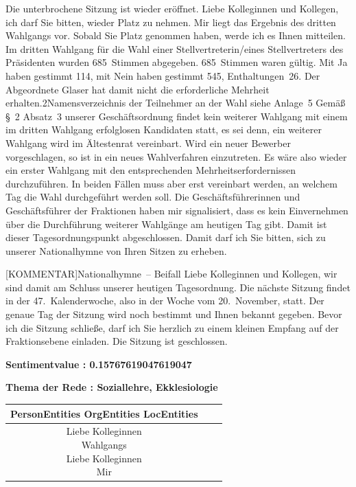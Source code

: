 \documentclass[a4paper,11pt]{article}
\begin{document}
Die unterbrochene Sitzung ist wieder eröffnet. Liebe Kolleginnen und Kollegen, ich darf Sie bitten, wieder Platz zu nehmen. Mir liegt das Ergebnis des dritten Wahlgangs vor. Sobald Sie Platz genommen haben, werde ich es Ihnen mitteilen. Im dritten Wahlgang für die Wahl einer Stellvertreterin/eines Stellvertreters des Präsidenten wurden 685 Stimmen abgegeben. 685 Stimmen waren gültig. Mit Ja haben gestimmt 114, mit Nein haben gestimmt 545, Enthaltungen 26. Der Abgeordnete Glaser hat damit nicht die erforderliche Mehrheit erhalten.2Namensverzeichnis der Teilnehmer an der Wahl siehe Anlage 5 Gemäß § 2 Absatz 3 unserer Geschäftsordnung findet kein weiterer Wahlgang mit einem im dritten Wahlgang erfolglosen Kandidaten statt, es sei denn, ein weiterer Wahlgang wird im Ältestenrat vereinbart. Wird ein neuer Bewerber vorgeschlagen, so ist in ein neues Wahlverfahren einzutreten. Es wäre also wieder ein erster Wahlgang mit den entsprechenden Mehrheitserfordernissen durchzuführen. In beiden Fällen muss aber erst vereinbart werden, an welchem Tag die Wahl durchgeführt werden soll. Die Geschäftsführerinnen und Geschäftsführer der Fraktionen haben mir signalisiert, dass es kein Einvernehmen über die Durchführung weiterer Wahlgänge am heutigen Tag gibt. Damit ist dieser Tagesordnungspunkt abgeschlossen. Damit darf ich Sie bitten, sich zu unserer Nationalhymne von Ihren Sitzen zu erheben.

[KOMMENTAR]Nationalhymne – Beifall
 Liebe Kolleginnen und Kollegen, wir sind damit am Schluss unserer heutigen Tagesordnung. Die nächste Sitzung findet in der 47. Kalenderwoche, also in der Woche vom 20. November, statt. Der genaue Tag der Sitzung wird noch bestimmt und Ihnen bekannt gegeben. Bevor ich die Sitzung schließe, darf ich Sie herzlich zu einem kleinen Empfang auf der Fraktionsebene einladen. Die Sitzung ist geschlossen.

\textbf{Sentimentvalue : 0.15767619047619047}

\textbf{Thema der Rede : Soziallehre, Ekklesiologie}
\vspace*{1cm}

\begin{table}[ht]
\centering
\begin{tabular}{||c | c | c||}
\hline
PersonEntities  OrgEntities  LocEntities \\ 

\hline\hline
\makecell{Liebe Kolleginnen \\
Wahlgangs \\
Liebe Kolleginnen \\
} 
\makecell{} 
\makecell{Mir \\
}\\
\hline
\end{tabular}
\end{table}
\clearpage
\end{document}
